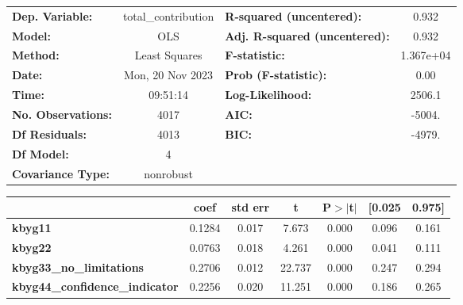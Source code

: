 \begin{center}
\begin{tabular}{lclc}
\toprule
\textbf{Dep. Variable:}                & total\_contribution & \textbf{  R-squared (uncentered):}      &     0.932   \\
\textbf{Model:}                        &         OLS         & \textbf{  Adj. R-squared (uncentered):} &     0.932   \\
\textbf{Method:}                       &    Least Squares    & \textbf{  F-statistic:       }          & 1.367e+04   \\
\textbf{Date:}                         &   Mon, 20 Nov 2023  & \textbf{  Prob (F-statistic):}          &     0.00    \\
\textbf{Time:}                         &       09:51:14      & \textbf{  Log-Likelihood:    }          &    2506.1   \\
\textbf{No. Observations:}             &          4017       & \textbf{  AIC:               }          &    -5004.   \\
\textbf{Df Residuals:}                 &          4013       & \textbf{  BIC:               }          &    -4979.   \\
\textbf{Df Model:}                     &             4       & \textbf{                     }          &             \\
\textbf{Covariance Type:}              &      nonrobust      & \textbf{                     }          &             \\
\bottomrule
\end{tabular}
\begin{tabular}{lcccccc}
                                       & \textbf{coef} & \textbf{std err} & \textbf{t} & \textbf{P$> |$t$|$} & \textbf{[0.025} & \textbf{0.975]}  \\
\midrule
\textbf{kbyg11}                        &       0.1284  &        0.017     &     7.673  &         0.000        &        0.096    &        0.161     \\
\textbf{kbyg22}                        &       0.0763  &        0.018     &     4.261  &         0.000        &        0.041    &        0.111     \\
\textbf{kbyg33\_no\_limitations}       &       0.2706  &        0.012     &    22.737  &         0.000        &        0.247    &        0.294     \\
\textbf{kbyg44\_confidence\_indicator} &       0.2256  &        0.020     &    11.251  &         0.000        &        0.186    &        0.265     \\

\end{tabular}
\end{center}
